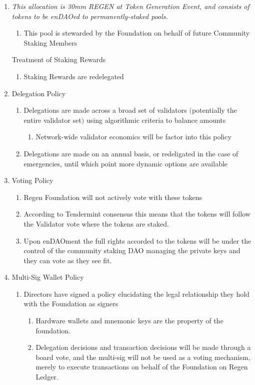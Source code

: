 \documentclass{article}
\begin{document}
\begin{enumerate}
\begin{enumerate}
\item {\it This allocation is 30mm REGEN at Token Generation Event, and consists of tokens to be enDAOed to permanently-staked pools.}
\begin{enumerate}
\item This pool is stewarded by the Foundation on behalf of future Community Staking Members
\end{enumerate}
Treatment of Staking Rewards
\begin{enumerate}
\item Staking Rewards are redelegated
\end{enumerate}
\item Delegation Policy
\begin{enumerate}
\item Delegations are made across a broad set of validators $($potentially the entire validator set$)$ using algorithmic criteria to balance amounts
\begin{enumerate}
\item Network-wide validator economics will be factor into this policy
\end{enumerate}
\item Delegations are made on an annual basis, or redeligated in the case of emergencies, until which point more dynamic options are available
\end{enumerate}
\item Voting Policy
\begin{enumerate}
\item Regen Foundation will not actively vote with these tokens
\item According to Tendermint consensus this means that the tokens will follow the Validator vote where the tokens are staked.  
\item Upon enDAOment the full rights accorded to the tokens will be under the control of the community staking DAO managing the private keys and they can vote as they see fit.
\end{enumerate}
\item Multi-Sig Wallet Policy
\begin{enumerate}
\item Directors have signed a policy elucidating the legal relationship they hold with the Foundation as signers
\begin{enumerate}
\item Hardware wallets and mnemonic keys are the property of the foundation.
\item Delegation decisions and transaction decisions will be made through a board vote, and the multi-sig will not be used as a voting mechanism, merely to execute transactions on behalf of the Foundation on Regen Ledger.

\end{enumerate}
\end{enumerate}
\end{enumerate}
\end{enumerate}
\end{document}

